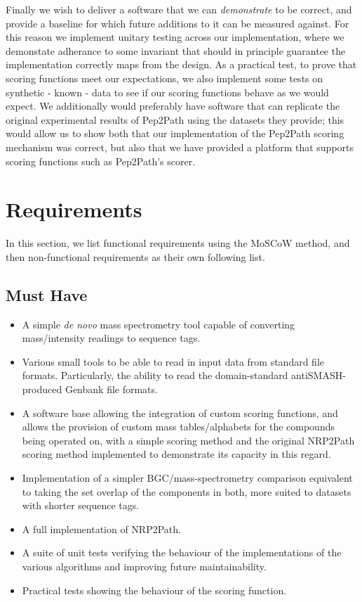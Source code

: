 \documentclass{l4proj}
\begin{document}
Finally we wish to deliver a software that we can \textit{demonstrate} to be correct, and provide a baseline for which future additions to it can be measured against. For this reason we implement unitary testing across our implementation, where we demonstate adherance to some invariant that should in principle guarantee the implementation correctly maps from the design. As a practical test, to prove that scoring functions meet our expectations, we also implement some tests on synthetic - known - data to see if our scoring functions behave as we would expect. We additionally would preferably have software that can replicate the original experimental results of Pep2Path using the datasets they provide; this would allow us to show both that our implementation of the Pep2Path scoring mechanism was correct, but also that we have provided a platform that supports scoring functions such as Pep2Path's scorer.

\section{Requirements}

In this section, we list functional requirements using the MoSCoW method, and then non-functional requirements as their own following list.

\subsection{Must Have}

\begin{itemize}

\item A simple \textit{de novo} mass spectrometry tool capable of converting mass/intensity readings to sequence tags.
\item Various small tools to be able to read in input data from standard file formats. Particularly, the ability to read the domain-standard antiSMASH-produced Genbank file formats.
\item A software base allowing the integration of custom scoring functions, and allows the provision of custom mass tables/alphabets for the compounds being operated on, with a simple scoring method and the original NRP2Path scoring method implemented to demonstrate its capacity in this regard.
\item Implementation of a simpler BGC/mass-spectrometry comparison equivalent to taking the set overlap of the components in both, more suited to datasets with shorter sequence tags.
\item A full implementation of NRP2Path.
\item A suite of unit tests verifying the behaviour of the implementations of the various algorithms and improving future maintainability.
\item Practical tests showing the behaviour of the scoring function.
\end{itemize}
\end{document}
